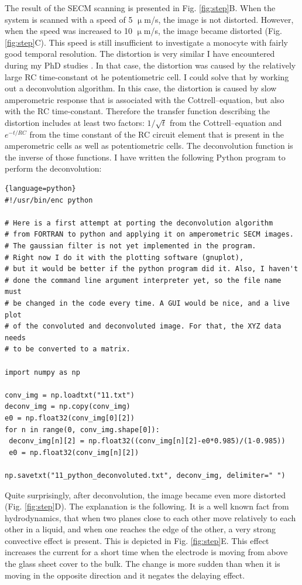 \documentclass[a4paper, 11pt, oneside, bibliography=totoc]{article}
\begin{document}
The result of the SECM scanning is presented in Fig. \ref{fig:step}B. When the system is scanned with a speed of 5 $\upmu$m/s, the image is not distorted. However, when the speed was increased to 10 $\upmu$m/s, the image became distorted (Fig. \ref{fig:step}C). This speed is still insufficient to investigate a monocyte with fairly good temporal resolution. The distortion is very similar I have encountered during my PhD studies \cite{kiss2015deconvolution, kiss2015deconvolution2}. In that case, the distortion was caused by the relatively large RC time-constant ot he potentiometric cell. I could solve that by working out a deconvolution algorithm. In this case, the distortion is caused by slow amperometric response that is associated with the Cottrell--equation, but also with the RC time-constant. Therefore the transfer function describing the distortion includes at least two factors: $1/\sqrt{t}$ from the Cottrell--equation and $e^{-t/RC}$ from the time constant of the RC circuit element that is present in the amperometric cells as well as potentiometric cells. The deconvolution function is the inverse of those functions. I have written the following Python program to perform the deconvolution:

\begin{lstlisting}{language=python}
#!/usr/bin/enc python

# Here is a first attempt at porting the deconvolution algorithm
# from FORTRAN to python and applying it on amperometric SECM images.
# The gaussian filter is not yet implemented in the program.
# Right now I do it with the plotting software (gnuplot),
# but it would be better if the python program did it. Also, I haven't
# done the command line argument interpreter yet, so the file name must
# be changed in the code every time. A GUI would be nice, and a live plot
# of the convoluted and deconvoluted image. For that, the XYZ data needs
# to be converted to a matrix.

import numpy as np

conv_img = np.loadtxt("11.txt")
deconv_img = np.copy(conv_img)
e0 = np.float32(conv_img[0][2])
for n in range(0, conv_img.shape[0]):
 deconv_img[n][2] = np.float32((conv_img[n][2]-e0*0.985)/(1-0.985))
 e0 = np.float32(conv_img[n][2])

np.savetxt("11_python_deconvoluted.txt", deconv_img, delimiter=" ")
\end{lstlisting}

Quite surprisingly, after deconvolution, the image became even more distorted (Fig. \ref{fig:step}D). The explanation is the following. It is a well known fact from hydrodynamics, that when two planes close to each other move relatively to each other in a liquid, and when one reaches the edge of the other, a very strong convective effect is present. This is depicted in Fig. \ref{fig:step}E. This effect increases the current for a short time when the electrode is moving from above the glass sheet cover to the bulk. The change is more sudden than when it is moving in the opposite direction and it negates the delaying effect.
\end{document}
